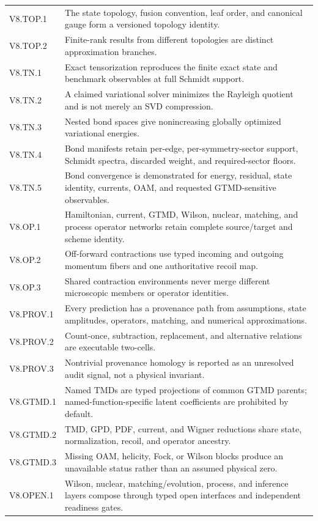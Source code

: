 \documentclass[11pt]{article}
\begin{document}
\begin{longtable}{L{0.15\textwidth}L{0.77\textwidth}}
V8.TOP.1 & The state topology, fusion convention, leaf order, and canonical gauge form a versioned topology identity.\\
V8.TOP.2 & Finite-rank results from different topologies are distinct approximation branches.\\
V8.TN.1 & Exact tensorization reproduces the finite exact state and benchmark observables at full Schmidt support.\\
V8.TN.2 & A claimed variational solver minimizes the Rayleigh quotient and is not merely an SVD compression.\\
V8.TN.3 & Nested bond spaces give nonincreasing globally optimized variational energies.\\
V8.TN.4 & Bond manifests retain per-edge, per-symmetry-sector support, Schmidt spectra, discarded weight, and required-sector floors.\\
V8.TN.5 & Bond convergence is demonstrated for energy, residual, state identity, currents, OAM, and requested GTMD-sensitive observables.\\
V8.OP.1 & Hamiltonian, current, GTMD, Wilson, nuclear, matching, and process operator networks retain complete source/target and scheme identity.\\
V8.OP.2 & Off-forward contractions use typed incoming and outgoing momentum fibers and one authoritative recoil map.\\
V8.OP.3 & Shared contraction environments never merge different microscopic members or operator identities.\\
V8.PROV.1 & Every prediction has a provenance path from assumptions, state amplitudes, operators, matching, and numerical approximations.\\
V8.PROV.2 & Count-once, subtraction, replacement, and alternative relations are executable two-cells.\\
V8.PROV.3 & Nontrivial provenance homology is reported as an unresolved audit signal, not a physical invariant.\\
V8.GTMD.1 & Named TMDs are typed projections of common GTMD parents; named-function-specific latent coefficients are prohibited by default.\\
V8.GTMD.2 & TMD, GPD, PDF, current, and Wigner reductions share state, normalization, recoil, and operator ancestry.\\
V8.GTMD.3 & Missing OAM, helicity, Fock, or Wilson blocks produce an unavailable status rather than an assumed physical zero.\\
V8.OPEN.1 & Wilson, nuclear, matching/evolution, process, and inference layers compose through typed open interfaces and independent readiness gates.\\

\end{longtable}
\end{document}
